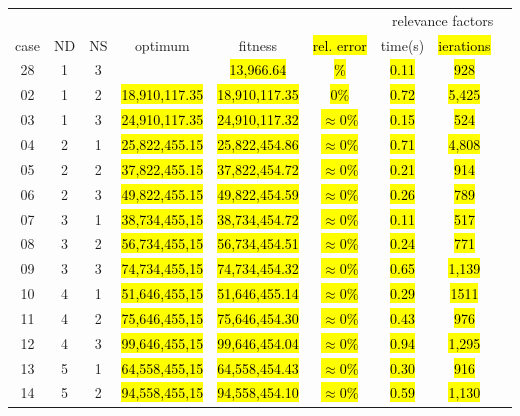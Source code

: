 \documentclass{singlecol}
\theoremstyle{TH}{
\newtheorem{lemma}{Lemma}
\newtheorem{theorem}[lemma]{Theorem}
\newtheorem{corrolary}[lemma]{Corrolary}
\newtheorem{conjecture}[lemma]{Conjecture}
\newtheorem{proposition}[lemma]{Proposition}
\newtheorem{claim}[lemma]{Claim}
\newtheorem{stheorem}[lemma]{Wrong Theorem}
\newtheorem{algorithm}{Algorithm}
}
\theoremstyle{THrm}{
\newtheorem{definition}{Definition}[section]
\newtheorem{question}{Question}[section]
\newtheorem{remark}{Remark}
\newtheorem{scheme}{Scheme}
}
\theoremstyle{THhit}{
\newtheorem{case}{Case}[section]
}
\begin{document}
\begin{table}[h!]
\begin{center}
\begin{small}
	\begin{tabular}{ c c c c c c c c c } 
         &    &    &                &           &           &   \multicolumn{3}{c}{relevance factors}  \\      
	case & ND & NS &  optimum &  fitness   & \hl{rel. error} &  time(s)  & \hl{ierations}     \\
	 28  &  1 & 3  &  \hl{}  &  \hl{13,966.64}  & \hl{\%} &  \hl{0.11}   &   \hl{928}       \\
	 02  &  1 & 2  &  \hl{18,910,117.35}  &  \hl{18,910,117.35}  & \hl{0\%} &  \hl{0.72}   &   \hl{5,425}    \\
	 03  &  1 & 3  &  \hl{24,910,117.35}  &  \hl{24,910,117.32}  & \hl{$\approx 0\%$} &  \hl{0.15}   &   \hl{524}     \\
	 04  &  2 & 1  & \hl{25,822,455.15} & \hl{25,822,454.86}  &  \hl{$\approx 0\%$} &  \hl{0.71}   &   \hl{4,808}    \\
	 05  &  2 & 2  & \hl{37,822,455.15} & \hl{37,822,454.72}  &  \hl{$\approx 0\%$} &  \hl{0.21}   &   \hl{914}      \\
	 06  &  2 & 3  & \hl{49,822,455.15} & \hl{49,822,454.59}  &  \hl{$\approx 0\%$} &  \hl{0.26}   &   \hl{789}     \\
	 07  &  3 & 1  & \hl{38,734,455,15} & \hl{38,734,454.72}  & \hl{$\approx 0\%$} &   \hl{0.11}   &    \hl{517}      \\
	 08  &  3 & 2  & \hl{56,734,455,15} & \hl{56,734,454.51}  & \hl{$\approx 0\%$} & \hl{0.24}  &  \hl{771}    \\
	 09  &  3 & 3  & \hl{74,734,455,15} & \hl{74,734,454.32}  & \hl{$\approx 0\%$} &   \hl{0.65} & \hl{1,139}   \\
	 10  &  4 & 1  & \hl{51,646,455,15} & \hl{51,646,455.14}  & \hl{$\approx 0\%$} &  \hl{0.29}   &  \hl{1511}    \\
	 11  &  4 & 2  & \hl{75,646,455,15} & \hl{75,646,454.30}  & \hl{$\approx 0\%$} &  \hl{0.43}   &    \hl{976}     \\
	 12  &  4 & 3  & \hl{99,646,455,15} & \hl{99,646,454.04}  & \hl{$\approx 0\%$} &  \hl{0.94}   &   \hl{1,295}      \\
	 13  &  5 & 1  & \hl{64,558,455,15} & \hl{64,558,454.43}  & \hl{$\approx 0\%$}  &  \hl{0.30}   &   \hl{916}    \\
	 14  &  5 & 2  & \hl{94,558,455,15} & \hl{94,558,454.10}  &  \hl{$\approx 0\%$} &  \hl{0.59}   &   \hl{1,130}    \\

\end{tabular}
\end{small}
\end{center}
\end{table}
\end{document}
